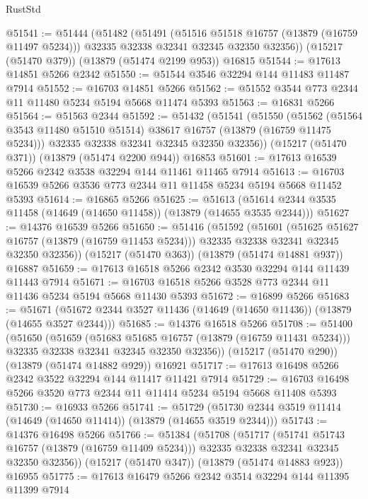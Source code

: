 \begin{lexlean}{RustStd}
\begin{coremodule}
@51541 := @51444
    (@51482
      (@51491
        (@51516 @51518 @16757 (@13879 (@16759 @11497 @5234)))
        @32335
        @32338
        @32341
        @32345
        @32350
        @32356))
    (@15217 (@51470 @379))
    (@13879 (@51474 @2199 @953))
    @16815
@51544 := @17613 @14851 @5266 @2342
@51550 := @51544 @3546 @32294 @144 @11483 @11487 @7914
@51552 := @16703 @14851 @5266
@51562 := @51552 @3544 @773 @2344 @11 @11480 @5234 @5194 @5668 @11474 @5393
@51563 := @16831 @5266
@51564 := @51563 @2344
@51592 := @51432
    (@51541
      (@51550
        (@51562 (@51564 @3543 @11480 @51510 @51514) @38617 @16757 (@13879 (@16759 @11475 @5234)))
        @32335
        @32338
        @32341
        @32345
        @32350
        @32356))
    (@15217 (@51470 @371))
    (@13879 (@51474 @2200 @944))
    @16853
@51601 := @17613 @16539 @5266 @2342 @3538 @32294 @144 @11461 @11465 @7914
@51613 := @16703 @16539 @5266 @3536 @773 @2344 @11 @11458 @5234 @5194 @5668 @11452 @5393
@51614 := @16865 @5266
@51625 := @51613 (@51614 @2344 @3535 @11458 (@14649 (@14650 @11458)) (@13879 (@14655 @3535 @2344)))
@51627 := @14376 @16539 @5266
@51650 := @51416
    (@51592
      (@51601
        (@51625 @51627 @16757 (@13879 (@16759 @11453 @5234)))
        @32335
        @32338
        @32341
        @32345
        @32350
        @32356))
    (@15217 (@51470 @363))
    (@13879 (@51474 @14881 @937))
    @16887
@51659 := @17613 @16518 @5266 @2342 @3530 @32294 @144 @11439 @11443 @7914
@51671 := @16703 @16518 @5266 @3528 @773 @2344 @11 @11436 @5234 @5194 @5668 @11430 @5393
@51672 := @16899 @5266
@51683 := @51671 (@51672 @2344 @3527 @11436 (@14649 (@14650 @11436)) (@13879 (@14655 @3527 @2344)))
@51685 := @14376 @16518 @5266
@51708 := @51400
    (@51650
      (@51659
        (@51683 @51685 @16757 (@13879 (@16759 @11431 @5234)))
        @32335
        @32338
        @32341
        @32345
        @32350
        @32356))
    (@15217 (@51470 @290))
    (@13879 (@51474 @14882 @929))
    @16921
@51717 := @17613 @16498 @5266 @2342 @3522 @32294 @144 @11417 @11421 @7914
@51729 := @16703 @16498 @5266 @3520 @773 @2344 @11 @11414 @5234 @5194 @5668 @11408 @5393
@51730 := @16933 @5266
@51741 := @51729 (@51730 @2344 @3519 @11414 (@14649 (@14650 @11414)) (@13879 (@14655 @3519 @2344)))
@51743 := @14376 @16498 @5266
@51766 := @51384
    (@51708
      (@51717
        (@51741 @51743 @16757 (@13879 (@16759 @11409 @5234)))
        @32335
        @32338
        @32341
        @32345
        @32350
        @32356))
    (@15217 (@51470 @347))
    (@13879 (@51474 @14883 @923))
    @16955
@51775 := @17613 @16479 @5266 @2342 @3514 @32294 @144 @11395 @11399 @7914

\end{coremodule}
\end{lexlean}
